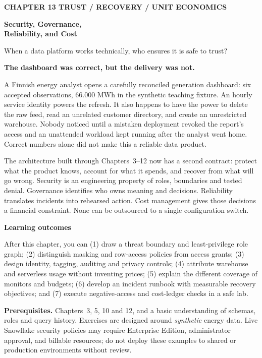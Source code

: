 \documentclass[11pt,twoside]{article}
\begin{document}
{\sffamily\bfseries\fontsize{9}{11}\selectfont\color{steelblue} CHAPTER 13 \hfill TRUST / RECOVERY / UNIT ECONOMICS}\par\vspace{3mm}
{\sffamily\bfseries\fontsize{20}{23}\selectfont\color{navy} Security, Governance,\\Reliability, and Cost}\par\vspace{2mm}
{\sffamily\fontsize{11}{14}\selectfont\color{steelblue} When a data platform works technically, who ensures it is safe to trust?}\par\vspace{3mm}
\begin{insight}\textbf{The dashboard was correct, but the delivery was not.}\par
A Finnish energy analyst opens a carefully reconciled generation dashboard: six accepted observations, 66.000 MWh in the synthetic teaching fixture. An hourly service identity powers the refresh. It also happens to have the power to delete the raw feed, read an unrelated customer directory, and create an unrestricted warehouse. Nobody noticed until a mistaken deployment revoked the report's access and an unattended workload kept running after the analyst went home. Correct numbers alone did not make this a reliable data product.
\end{insight}
The architecture built through Chapters~3--12 now has a second contract: protect what the product knows, account for what it spends, and recover from what will go wrong. Security is an engineering property of roles, boundaries and tested denial. Governance identifies who owns meaning and decisions. Reliability translates incidents into rehearsed action. Cost management gives those decisions a financial constraint. None can be outsourced to a single configuration switch.
\begin{whitebox}\textbf{Learning outcomes}\par
After this chapter, you can (1) draw a threat boundary and least-privilege role graph; (2) distinguish masking and row-access policies from access grants; (3) design identity, tagging, auditing and privacy controls; (4) attribute warehouse and serverless usage without inventing prices; (5) explain the different coverage of monitors and budgets; (6) develop an incident runbook with measurable recovery objectives; and (7) execute negative-access and cost-ledger checks in a safe lab.
\end{whitebox}
\textbf{Prerequisites.} Chapters~3, 5, 10 and 12, and a basic understanding of schemas, roles and query history. Exercises are designed around \emph{synthetic} energy data. Live Snowflake security policies may require Enterprise Edition, administrator approval, and billable resources; do not deploy these examples to shared or production environments without review.
\end{document}

